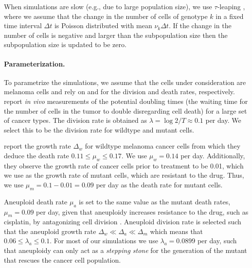\documentclass[12pt]{extarticle}
\begin{document}
When simulations are slow (e.g., due to large population size), we use $\tau$-leaping \citep{gillespie2001approximate}, where we assume that the change in the number of cells of genotype $k$ in a fixed time interval $\Delta t$ is Poisson distributed with mean $\nu_k \Delta t$. If the change in the number of cells is negative and larger than the subpopulation size then the subpopulation size is updated to be zero. 



\paragraph{Parameterization.}
To parametrize the simulations, we assume that the cells under consideration are melanoma cells and rely on \citet{rew2000cell} and \citet{bozic2013evolutionary} for the division and death rates, respectively. 
\citet{rew2000cell} report \emph{in vivo} measurements of the potential doubling times (the waiting time for the number of cells in the tumor to double disregarding cell death) for a large set of cancer types. The division rate is obtained as $\lambda=\log{2} / T \approx 0.1$ per day. We select this to be the division rate for wildtype and mutant cells. %

\citet{bozic2013evolutionary} report the growth rate $\Delta_w$ for wildtype melanoma cancer cells from which they deduce the death rate $0.11 \le \mu_w \le 0.17$. We use  $\mu_w=0.14$ per day. Additionally, they observe the growth rate of cancer cells prior to treatment to be 0.01, which we use as the growth rate of mutant cells, which are resistant to the drug. Thus, we use $\mu_m=0.1-0.01=0.09$ per day as the death rate for mutant cells.

 Aneuploid death rate $\mu_a$ is set to the same value as the mutant death rates, $\mu_m=0.09$ per day, given that aneuploidy increases resistance to the drug, such as cisplatin, by antagonizing cell division \citep{replogle2020aneuploidy}. Aneuploid division rate is selected such that the aneuploid growth rate $\Delta_w\ll\Delta_a\ll\Delta_m$ which means that $0.06 \le \lambda_a \le 0.1$. For most of our simulations we use $\lambda_a=0.0899$ per day, such that aneuploidy can only act as a \emph{stepping stone} for the generation of the mutant that rescues the cancer cell population.
\end{document}
